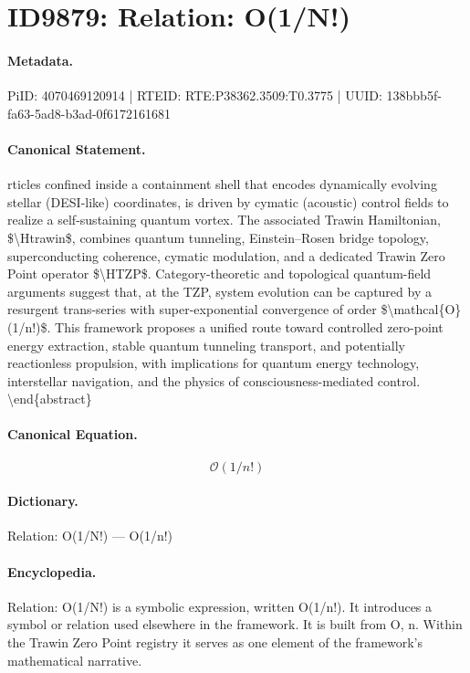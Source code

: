 \section*{ID9879: Relation: O(1/N!)}
\paragraph{Metadata.}
PiID: 4070469120914 | RTEID: RTE:P38362.3509:T0.3775 | UUID: 138bbb5f-fa63-5ad8-b3ad-0f6172161681

\paragraph{Canonical Statement.}
rticles confined inside a containment shell that encodes dynamically evolving stellar (DESI-like) coordinates, is driven by cymatic (acoustic) control fields to realize a self-sustaining quantum vortex. The associated Trawin Hamiltonian, \$\textbackslash{}Htrawin\$, combines quantum tunneling, Einstein--Rosen bridge topology, superconducting coherence, cymatic modulation, and a dedicated Trawin Zero Point operator \$\textbackslash{}HTZP\$. Category-theoretic and topological quantum-field arguments suggest that, at the TZP, system evolution can be captured by a resurgent trans-series with super-exponential convergence of order \$\textbackslash{}mathcal\{O\}(1/n!)\$. This framework proposes a unified route toward controlled zero-point energy extraction, stable quantum tunneling transport, and potentially reactionless propulsion, with implications for quantum energy technology, interstellar navigation, and the physics of consciousness-mediated control. \textbackslash{}end\{abstract\}

\paragraph{Canonical Equation.}
\[
\mathcal{O}(1/n!)
\]

\paragraph{Dictionary.}
Relation: O(1/N!) — O(1/n!)

\paragraph{Encyclopedia.}
Relation: O(1/N!) is a symbolic expression, written O(1/n!). It introduces a symbol or relation used elsewhere in the framework. It is built from O, n. Within the Trawin Zero Point registry it serves as one element of the framework's mathematical narrative.
